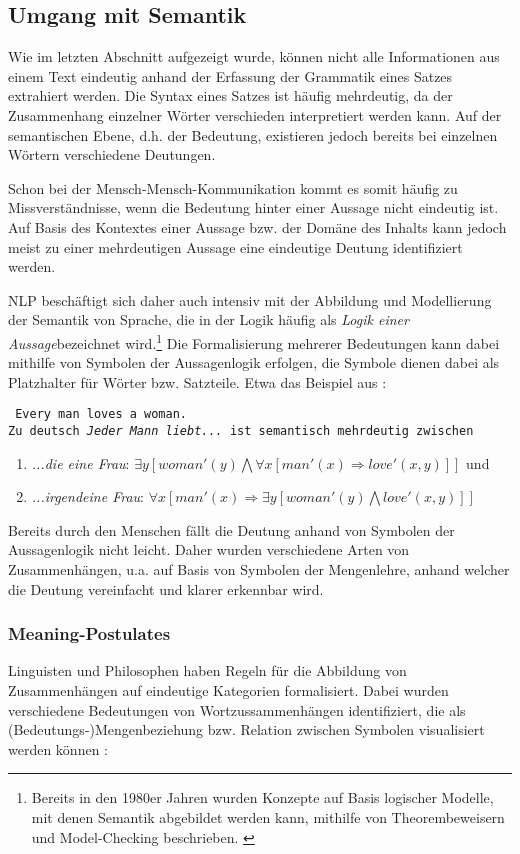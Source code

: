 \documentclass[12pt]{report}
\begin{document}
\subsection{Umgang mit Semantik}
Wie im letzten Abschnitt aufgezeigt wurde, können nicht alle Informationen aus einem Text eindeutig anhand der Erfassung der Grammatik eines Satzes extrahiert werden. Die Syntax eines Satzes ist häufig mehrdeutig, da der Zusammenhang einzelner Wörter verschieden interpretiert werden kann. Auf der semantischen Ebene, d.h. der Bedeutung, existieren jedoch bereits bei einzelnen Wörtern verschiedene Deutungen. 

Schon bei der Mensch-Mensch-Kommunikation kommt es somit häufig zu Missverständnisse, wenn die Bedeutung hinter einer Aussage nicht eindeutig ist. Auf Basis des Kontextes einer Aussage bzw. der Domäne des Inhalts kann jedoch meist zu einer mehrdeutigen Aussage eine eindeutige Deutung identifiziert werden.

NLP beschäftigt sich daher auch intensiv mit der Abbildung und Modellierung der Semantik von Sprache, die in der Logik häufig als \glqq \textit{Logik einer Aussage}\grqq bezeichnet wird.\footnote{Bereits in den 1980er Jahren wurden Konzepte auf Basis logischer Modelle, mit denen Semantik abgebildet werden kann, mithilfe von Theorembeweisern und Model-Checking beschrieben. \cite{sb88} \cite{kn85}} Die Formalisierung mehrerer Bedeutungen kann dabei mithilfe von Symbolen der Aussagenlogik erfolgen, die Symbole dienen dabei als Platzhalter für Wörter bzw. Satzteile. Etwa das Beispiel aus \cite{rs18}:

\tt
Every man loves a woman.
\rm
\\
Zu deutsch \textit{\glqq  Jeder Mann liebt...\grqq{}} ist semantisch mehrdeutig zwischen  
\begin{enumerate}
\item \textit{\glqq  ...die eine Frau\grqq{}}: $\exists y [woman'(y) \bigwedge \forall x [man'(x) \Rightarrow love'(x,y)]]$ und
\item \textit{\glqq  ...irgendeine Frau\grqq{}}: $\forall x [man'(x) \Rightarrow \exists y [woman'(y) \bigwedge love'(x,y)]]$
\end{enumerate}

Bereits durch den Menschen fällt die Deutung anhand von Symbolen der Aussagenlogik nicht leicht. Daher wurden verschiedene Arten von Zusammenhängen, u.a. auf Basis von Symbolen der Mengenlehre, anhand welcher die Deutung vereinfacht und klarer erkennbar wird. 

\subsubsection{Meaning-Postulates}
Linguisten und Philosophen haben Regeln für die Abbildung von Zusammenhängen auf eindeutige Kategorien formalisiert. Dabei wurden verschiedene Bedeutungen von Wortzussammenhängen identifiziert, die als (Bedeutungs-)Mengenbeziehung bzw. Relation zwischen Symbolen visualisiert werden können \cite{car52}:
\end{document}
